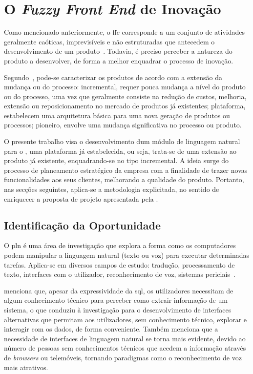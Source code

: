 \section{O \textit{Fuzzy Front End} de Inovação}
Como mencionado anteriormente, o \gls{ffe} corresponde a um conjunto de atividades geralmente caóticas, imprevisíveis e não estruturadas que antecedem o desenvolvimento de um produto~\parencite{ffe_incremental_platform_breakthrough_products}. Todavia, é preciso perceber a natureza do produto a desenvolver, de forma a melhor enquadrar o processo de inovação.

Segundo~\textcite{ffe_incremental_platform_breakthrough_products}, pode-se caracterizar os produtos de acordo com a extensão da mudança ou do processo: incremental, requer pouca mudança a nível do produto ou do processo, uma vez que geralmente consiste na redução de custos, melhoria, extensão ou reposicionamento no mercado de produtos já existentes; plataforma, estabelecem uma arquitetura básica para uma nova geração de produtos ou processos; pioneiro, envolve uma mudança significativa no processo ou produto.

O presente trabalho visa o desenvolvimento dum módulo de linguagem natural para o {\productname}, uma plataforma já estabelecida, ou seja, trata-se de uma extensão ao produto já existente, enquadrando-se no tipo incremental. A ideia surge do processo de planeamento estratégico da empresa com a finalidade de trazer novas funcionalidades aos seus clientes, melhorando a qualidade do produto. Portanto, nas secções seguintes, aplica-se a metodologia explicitada, no sentido de enriquecer a proposta de projeto apresentada pela {\companyname}.

\subsection{Identificação da Oportunidade}
O \gls{pln} é uma área de investigação que explora a forma como os computadores podem manipular a linguagem natural (texto ou voz) para executar determinadas tarefas. Aplica-se em diversos campos de estudo: tradução, processamento de texto, interfaces com o utilizador, reconhecimento de voz, sistemas periciais~\parencite{nlp}.

\textcite{end_to_end_neural_nli_databases} menciona que, apesar da expressividade da \gls{sql}, os utilizadores necessitam de algum conhecimento técnico para perceber como extrair informação de um sistema, o que conduziu à investigação para o desenvolvimento de interfaces alternativas que permitam aos utilizadores, sem conhecimento técnico, explorar e interagir com os dados, de forma conveniente. Também \textcite{towards_theory_nli_databases} menciona que a necessidade de interfaces de linguagem natural se torna mais evidente, devido ao número de pessoas sem conhecimentos técnicos que acedem a informação através de \textit{browsers} ou telemóveis, tornando paradigmas como o reconhecimento de voz mais atrativos.

